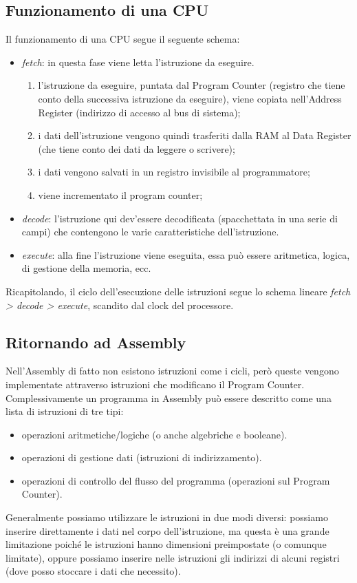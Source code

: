 \documentclass[class=book, crop=false]{standalone}
\begin{document}
\subsection{Funzionamento di una CPU}
Il funzionamento di una CPU segue il seguente schema:
\begin{itemize}[noitemsep]
	\item \emph{fetch}: in questa fase viene letta l'istruzione da eseguire.
	\begin{enumerate}
		\item l'istruzione da eseguire, puntata dal Program Counter (registro che tiene conto della successiva istruzione da eseguire), viene copiata nell'Address Register (indirizzo di accesso al bus di sistema);
		\item i dati dell'istruzione vengono quindi trasferiti dalla RAM al Data Register (che tiene conto dei dati da leggere o scrivere);
		\item i dati vengono salvati in un registro invisibile al programmatore;
		\item viene incrementato il program counter;
	\end{enumerate}
	\item \emph{decode}: l’istruzione qui dev’essere decodificata (spacchettata in una serie di campi) che contengono le varie caratteristiche dell’istruzione.
	\item \emph{execute}: alla fine l’istruzione viene eseguita, essa può essere aritmetica, logica, di gestione della memoria, ecc.
\end{itemize}
Ricapitolando, il ciclo dell’esecuzione delle istruzioni segue lo schema lineare \emph{fetch > decode > execute}, scandito dal clock del processore.

\subsection*{Ritornando ad Assembly}
Nell’Assembly di fatto non esistono istruzioni come i cicli, però queste vengono implementate attraverso istruzioni che modificano il Program Counter.
Complessivamente un programma in Assembly può essere descritto come una lista di istruzioni di tre tipi:
\begin{itemize}[noitemsep]
	\item operazioni aritmetiche/logiche (o anche algebriche e booleane).
	\item operazioni di gestione dati (istruzioni di indirizzamento).
	\item operazioni di controllo del flusso del programma (operazioni sul Program Counter).
\end{itemize}
Generalmente possiamo utilizzare le istruzioni in due modi diversi: possiamo inserire direttamente i dati nel corpo dell'istruzione, ma questa è una grande limitazione poiché le istruzioni hanno dimensioni preimpostate (o comunque limitate), oppure possiamo inserire nelle istruzioni gli indirizzi di alcuni registri (dove posso stoccare i dati che necessito).
\end{document}
